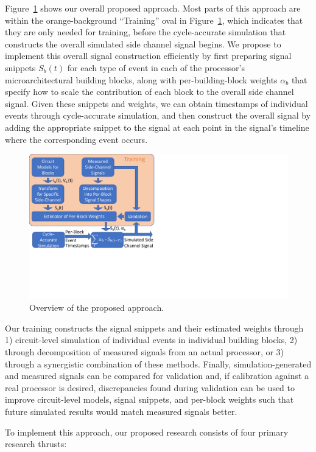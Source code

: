 Figure~\ref{fig:overview} shows our overall proposed approach. Most parts of this approach are within the orange-background ``Training'' oval in Figure~\ref{fig:overview}, which indicates that they are only needed for training, before the cycle-accurate simulation that constructs the overall simulated side channel signal begins.
We propose to implement this overall signal construction efficiently by first preparing signal snippets $S_b(t)$ for each type of event in each of the processor's microarchitectural building blocks, along with per-building-block weights ${\alpha}_b$ that specify how to scale the contribution of each block to the overall side channel signal.
Given these snippets and weights, we can obtain timestamps of individual events through cycle-accurate simulation, and then construct the overall signal by adding the appropriate snippet to the signal at each point in the signal's timeline where the corresponding event occurs.

\begin{figure}
	\centering
	\includegraphics[width=0.45\columnwidth,trim={0in 2.65in 6.89in 0in},clip]{figure/overview.pdf}
	\vspace{-0.3in}
	\caption{Overview of the proposed approach.}
	\label{fig:overview}
\end{figure}
Our training constructs the signal snippets and their estimated weights through 1) circuit-level simulation of individual events in individual building blocks, 2) through decomposition of measured signals from an actual processor, or 3) through a synergistic combination of these methods. Finally, simulation-generated and measured signals can be compared for validation and, if calibration against a real processor is desired, discrepancies found during validation can be used to improve circuit-level models, signal snippets, and per-block weights such that future simulated results would match measured signals better.

To implement this approach, our proposed research consists of four primary research thrusts:

